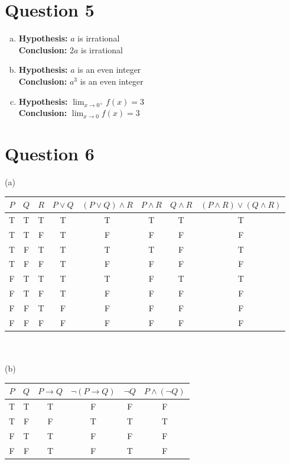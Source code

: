 \documentclass{article}
\begin{document}
\section*{Question 5}
\begin{enumerate}[(a)]
    \item \textbf{Hypothesis: } $a$ is irrational \\ 
          \textbf{Conclusion: } $2a$ is irrational
    \item \textbf{Hypothesis: } $a$ is an even integer \\ 
          \textbf{Conclusion: } $a^3$ is an even integer
    \item \textbf{Hypothesis: } $\lim_{x \to 0^+} f(x) = 3$ \\
          \textbf{Conclusion: } $\lim_{x \to 0} f(x) = 3$
\end{enumerate}

\section*{Question 6}
(a) \\
\begin{tabular}{c|c|c|c|c|c|c|c}
    $P$ & $Q$ & $R$ & $P \lor Q$ & $(P \lor Q) \land R$ & $P \land R$ & $Q \land R$ & $(P \land R) \lor (Q \land R)$ \\
    \hline
    T & T & T & T & T & T & T & T \\
    T & T & F & T & F & F & F & F \\
    T & F & T & T & T & T & F & T \\
    T & F & F & T & F & F & F & F \\
    F & T & T & T & T & F & T & T \\
    F & T & F & T & F & F & F & F \\
    F & F & T & F & F & F & F & F \\
    F & F & F & F & F & F & F & F \\
\end{tabular}
\\
\\
(b) \\
\begin{tabular}{c|c|c|c|c|c}
    $P$ & $Q$ & $P \rightarrow Q$ & $\neg (P \rightarrow Q)$ & $\neg Q$ & $P \land (\neg Q)$ \\
    \hline
    T & T & T & F & F & F \\
    T & F & F & T & T & T \\
    F & T & T & F & F & F \\
    F & F & T & F & T & F \\
\end{tabular}
\end{document}
